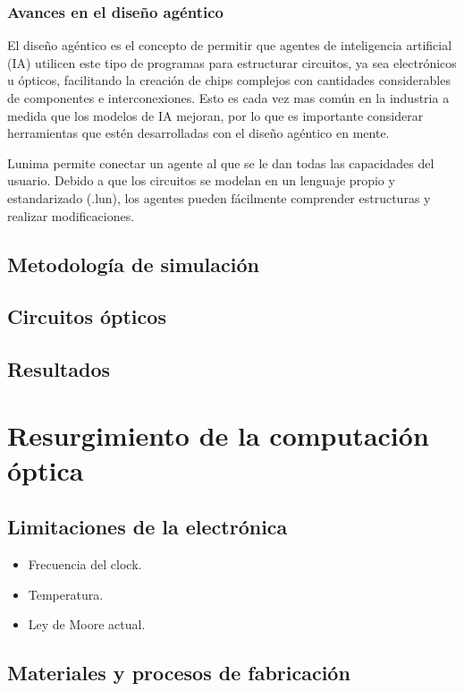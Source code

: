 \documentclass[12pt,a4paper]{report}
\begin{document}
\subsection{Avances en el diseño agéntico}

El diseño agéntico es el concepto de permitir que agentes de inteligencia artificial (IA) utilicen este tipo de programas para estructurar circuitos, ya sea electrónicos u ópticos, facilitando la creación de chips complejos con cantidades considerables de componentes e interconexiones. Esto es cada vez mas común en la industria a medida que los modelos de IA mejoran, por lo que es importante considerar herramientas que estén desarrolladas con el diseño agéntico en mente.

Lunima permite conectar un agente al que se le dan todas las capacidades del usuario. Debido a que los circuitos se modelan en un lenguaje propio y estandarizado (.lun), los agentes pueden fácilmente comprender estructuras y realizar modificaciones.

\section{Metodología de simulación}

\section{Circuitos ópticos}

\section{Resultados}


\chapter{Resurgimiento de la computación óptica}

\section{Limitaciones de la electrónica}

\begin{itemize}[nosep]
    \item Frecuencia del clock.
    \item Temperatura.
    \item Ley de Moore actual.
\end{itemize}

\section{Materiales y procesos de fabricación}
\end{document}
